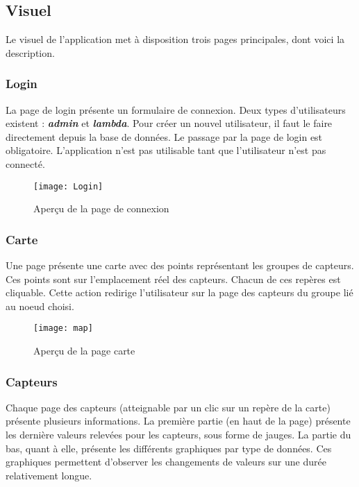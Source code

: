 \subsection{Visuel}

Le visuel de l'application met à disposition trois pages principales, dont voici la description.

\subsubsection{Login}

La page de login présente un formulaire de connexion. Deux types d'utilisateurs existent : \textbf{\emph{admin}} et \textbf{\emph{lambda}}. Pour créer un nouvel utilisateur, il faut le faire directement depuis la base de données. Le passage par la page de login est obligatoire. L'application n'est pas utilisable tant que l'utilisateur n'est pas connecté.
\vspace{5mm}

\begin{figure}[h!]
\centering
\texttt{[image: Login]}
\caption{Aperçu de la page de connexion}
\end{figure}
\clearpage

\subsubsection{Carte}

Une page présente une carte avec des points représentant les groupes de capteurs. Ces points sont sur l'emplacement réel des capteurs. Chacun de ces repères est cliquable. Cette action redirige l'utilisateur sur la page des capteurs du groupe lié au noeud choisi.
\vspace{5mm}

\begin{figure}[h!]
\centering
\texttt{[image: map]}
\caption{Aperçu de la page carte}
\end{figure}
\clearpage

\subsubsection{Capteurs}

Chaque page des capteurs (atteignable par un clic sur un repère de la carte) présente plusieurs informations. La première partie (en haut de la page) présente les dernière valeurs relevées pour les capteurs, sous forme de jauges. La partie du bas, quant à elle, présente les différents graphiques par type de données. Ces graphiques permettent d'observer les changements de valeurs sur une durée relativement longue.

